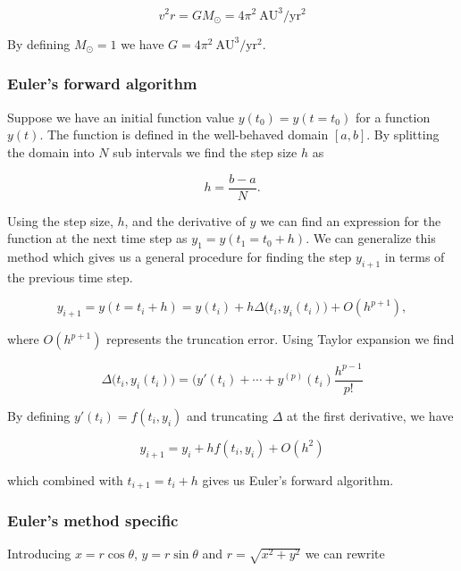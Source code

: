 \documentclass[a4paper, fontsize=11pt]{article}
\begin{document}
\begin{equation}
v^2 r = G M_{\odot}=4 \pi^2 \: \text{AU}^3/\text{yr}^2
\end{equation}

By defining $M_{\odot} = 1$ we have $G=4\pi^2 \: \text{AU}^3/\text{yr}^2$.



\subsubsection{Euler's forward algorithm}
Suppose we have an initial function value $y(t_{0})=y(t=t_{0})$ for a function $y(t)$. The function is defined in the well-behaved domain $[a, b]$. By splitting the domain into $N$ sub intervals we find the step size $h$ as

\begin{equation}
h=\dfrac{b-a}{N}.
\end{equation}

Using the step size, $h$, and the derivative of $y$ we can find an expression for the function at the next time step as $y_{1}=y(t_{1}=t_{0}+h)$. We can generalize this method which gives us a general procedure for finding the step $y_{i+1}$ in terms of the previous time step.

\begin{equation}
y_{i+1}=y(t=t_{i}+h)=y(t_{i})+h \Delta \big(t_{i},y_{i}(t_{i}) \big) + O(h^{p+1}),
\end{equation}

where $O(h^{p+1})$ represents the truncation error. Using Taylor expansion we find 

\begin{equation}
\Delta \big(t_{i}, y_{i}(t_{i}) \big) =(y'(t_{i}) + \cdots + y^{(p)}(t_{i})\dfrac{h^{p-1}}{p!}
\end{equation}

By defining $y'(t_{i})=f(t_{i}, y_{i})$ and truncating $\Delta$ at the first derivative, we have 

\begin{equation}
y_{i+1}=y_{i} + h f(t_{i},y_{i}) + O(h^2)
\end{equation}

which combined with $t_{i+1}=t_{i}+h$ gives us Euler's forward algorithm. \cite{H-Jensen}

\subsubsection{Euler's method specific}
Introducing $x = r \cos \theta$, $y=r \sin \theta$ and $r=\sqrt{x^2+y^2}$ we can rewrite 
\end{document}
